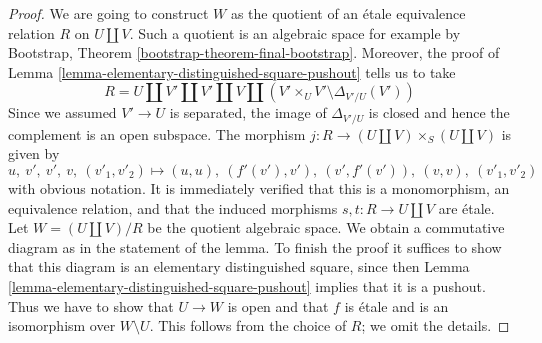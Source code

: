 \documentclass[10pt,a4paper]{amsart}
\theoremstyle{plain}
\theoremstyle{definition}
\theoremstyle{remark}
\numberwithin{equation}{subsection}
\begin{document}
\begin{proof}
We are going to construct $W$ as the quotient of an \'etale
equivalence relation $R$ on $U \amalg V$. Such a quotient is an
algebraic space for example by
Bootstrap, Theorem \ref{bootstrap-theorem-final-bootstrap}.
Moreover, the proof of
Lemma \ref{lemma-elementary-distinguished-square-pushout} tells us to take
$$
R = U \amalg V' \amalg V' \amalg V \amalg
(V' \times_U V' \setminus \Delta_{V'/U}(V'))
$$
Since we assumed $V' \to U$ is separated, the image of
$\Delta_{V'/U}$ is closed and hence the complement is an
open subspace. The morphism $j : R \to (U \amalg V) \times_S (U \amalg V)$
is given by
$$
u,\ v',\ v',\ v,\ (v'_1, v'_2) \mapsto
(u, u),\ (f'(v'), v'),\ (v', f'(v')),\ (v, v),\ (v'_1, v'_2)
$$
with obvious notation. It is immediately verified that this is a
monomorphism, an equivalence relation, and that the induced morphisms
$s, t : R \to U \amalg V$ are \'etale. Let
$W = (U \amalg V)/R$ be the quotient algebraic space.
We obtain a commutative diagram as in the statement of the lemma.
To finish the proof it suffices to show that this diagram is
an elementary distinguished square, since then
Lemma \ref{lemma-elementary-distinguished-square-pushout}
implies that it is a pushout.
Thus we have to show that $U \to W$ is open and that
$f$ is \'etale and is an isomorphism over $W \setminus U$.
This follows from the choice of $R$; we omit the details.
\end{proof}
\end{document}
